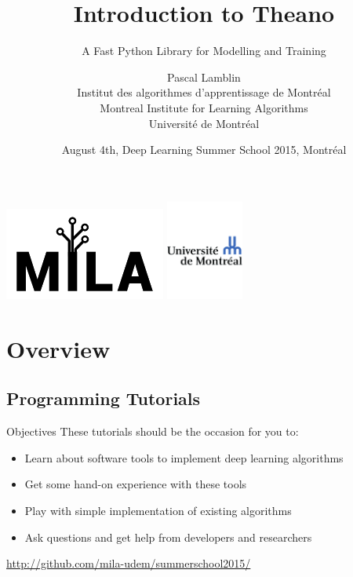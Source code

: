 \documentclass[a4paper,9pt]{beamer}
\title[Intro to Theano]{Introduction to Theano}
\subtitle{A Fast Python Library for Modelling and Training}
\author[LISA lab]{Pascal Lamblin \\
Institut des algorithmes d'apprentissage de Montréal\\
Montreal Institute for Learning Algorithms\\
Université de Montréal}
\date{%
August 4th, Deep Learning Summer School 2015, Montréal
}
\begin{document}
\begin{frame}[plain]
  \titlepage
  \includegraphics[width=.8in]{mila.png}
  \hfill
  \includegraphics[width=1in]{UdeM_logo.pdf}
\end{frame}

\section{Overview}
\begin{frame}
  \tableofcontents[currentsection]
\end{frame}

\subsection{Programming Tutorials}

\begin{frame}{Objectives}
  These tutorials should be the occasion for you to:
  \begin{itemize}
    \item Learn about software tools to implement deep learning algorithms
    \item Get some hand-on experience with these tools
    \item Play with simple implementation of existing algorithms
    \item Ask questions and get help from developers and researchers
  \end{itemize}

  \url{http://github.com/mila-udem/summerschool2015/}
\end{frame}
\end{document}
